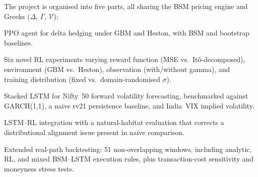 \documentclass[12pt,a4paper]{article}
\begin{document}
The project is organised into five parts, all sharing the BSM pricing engine
and Greeks ($\Delta$, $\Gamma$, $\mathcal{V}$):

\begin{description}[leftmargin=2.2cm,style=nextline]
  \item[Part I]  PPO agent for delta hedging under GBM and Heston, with BSM
        and bootstrap baselines.
  \item[Part II]  Six novel RL experiments varying reward function (MSE
        vs.\ It\^{o}-decomposed), environment (GBM vs.\ Heston), observation
        (with/without gamma), and training distribution (fixed vs.\
        domain-randomised $\sigma$).
  \item[Part III]  Stacked LSTM for Nifty~50 forward volatility forecasting,
        benchmarked against GARCH(1,1), a naive rv21 persistence baseline, and
        India~VIX implied volatility.
  \item[Part IV]  LSTM--RL integration with a natural-habitat evaluation that
        corrects a distributional alignment issue present in naive comparison.
  \item[Part V]  Extended real-path backtesting: 51 non-overlapping windows,
        including analytic, RL, and mixed BSM--LSTM execution rules, plus
        transaction-cost sensitivity and moneyness stress tests.
\end{description}
\end{document}
